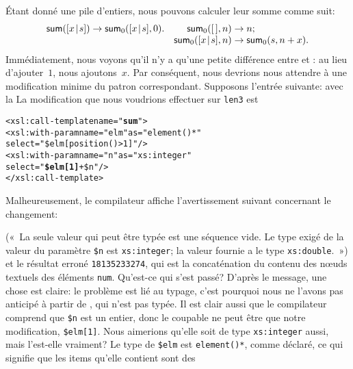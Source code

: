 Étant donné une pile d'entiers, nous pouvons calculer leur somme comme suit:
\begin{equation*}
\begin{array}{@{}r@{\;}l@{\;}lr@{\;}l@{\;}l@{}}
\fun{sum}(\cons{x}{s}) & \rightarrow & \fun{sum}_0(\cons{x}{s},0). &
\fun{sum}_0(\el,n) & \rightarrow & n;\\
&&& \fun{sum}_0(\cons{x}{s},n) & \rightarrow & \fun{sum}_0(s,n+x).
\end{array}
\end{equation*}
Immédiatement, nous voyons qu'il n'y a qu'une petite différence entre
 et : au lieu d'ajouter~\(1\), nous
ajoutons~\(x\). Par conséquent, nous devrions nous attendre à une
modification minime du patron \XSLT correspondant. Supposons l'entrée suivante:
\noindent avec la \DTD
{}
\noindent La modification que nous voudrions effectuer sur \texttt{len3} est
\begin{alltt}
\small        <xsl:call-template name="\textbf{sum}">
          <xsl:with-param name="elm" as="element()*"
                          select="\$elm[position()>1]"/>
          <xsl:with-param name="n" as="xs:integer"
                          select="\textbf{\$elm[1]} + \$n"/>
        </xsl:call-template>
\end{alltt}
Malheureusement, le compilateur \Saxon affiche l'avertissement suivant
concernant le changement:
(«~La seule valeur qui peut être typée est une séquence vide. Le type
exigé de la valeur du paramètre \texttt{\$n} est \texttt{xs:integer};
la valeur fournie a le type \texttt{xs:double}.~») et le résultat
erroné \texttt{18135233274}, qui est la concaténation du contenu des
n{\oe}uds textuels des éléments \texttt{num}. Qu'est-ce qui s'est
passé? D'après le message, une chose est claire: le problème est lié
au typage, c'est pourquoi nous ne l'avons pas anticipé à partir de
, qui n'est pas typée. Il est clair aussi que le
compilateur comprend que \texttt{\$n} est un entier, donc le coupable
ne peut être que notre modification, \texttt{\$elm[1]}. Nous aimerions
qu'elle soit de type \texttt{xs:integer} aussi, mais l'est-elle
vraiment? Le type de \texttt{\$elm} est \texttt{element()*}, comme
déclaré, ce qui signifie que les items qu'elle contient sont des
